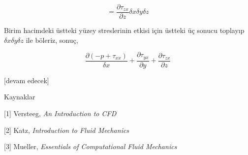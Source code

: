 \documentclass[12pt,fleqn]{article}\usepackage{../../common}
\begin{document}
$$
= \frac{\partial \tau_{zx}}{\partial z} \delta x \delta y \delta z 
$$

Birim hacimdeki üstteki yüzey streslerinin etkisi için üstteki üç sonucu
toplayıp $\delta x \delta y \delta z $ ile böleriz, sonuç,

$$
\frac{\partial (-p + \tau_{xx})}{\delta x} +
\frac{\partial \tau_{yx}}{\partial y} +
\frac{\partial \tau_{zx}}{\partial z} 
$$






[devam edecek]

Kaynaklar

[1] Versteeg, {\em An Introduction to CFD}

[2] Katz, {\em Introduction to Fluid Mechanics}

[3] Mueller, {\em Essentials of Computational Fluid Mechanics}
\end{document}
